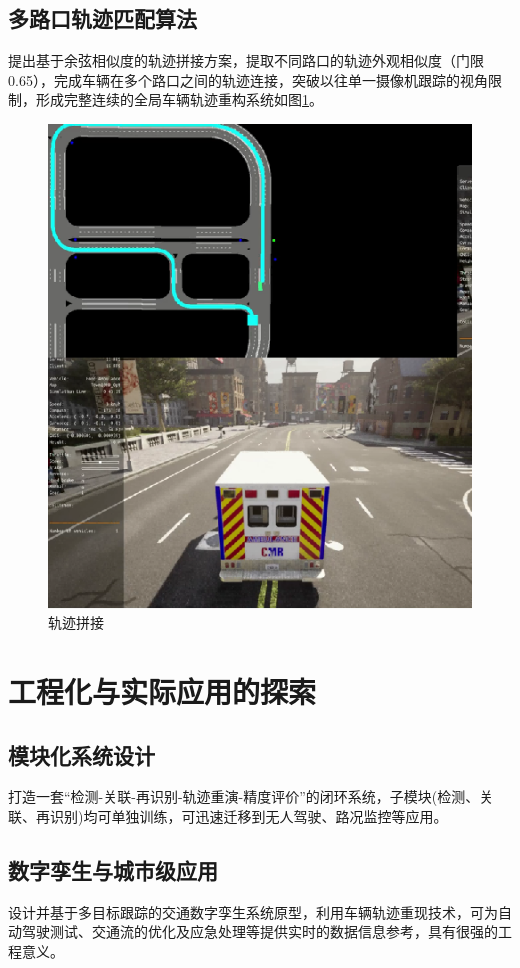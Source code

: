 \subsection{多路口轨迹匹配算法}

提出基于余弦相似度的轨迹拼接方案，提取不同路口的轨迹外观相似度（门限0.65），完成车辆在多个路口之间的轨迹连接，突破以往单一摄像机跟踪的视角限制，形成完整连续的全局车辆轨迹重构系统如图\ref{fig:p32}。


\begin{figure}[htbp] %
	\centering
	\includegraphics[width=1\textwidth]{p32} %
	\caption{轨迹拼接} %
	\label{fig:p32} %
\end{figure}




\section{工程化与实际应用的探索}

\subsection{模块化系统设计}

打造一套“检测-关联-再识别-轨迹重演-精度评价”的闭环系统，子模块(检测、关联、再识别)均可单独训练，可迅速迁移到无人驾驶、路况监控等应用。


\subsection{数字孪生与城市级应用}

设计并基于多目标跟踪的交通数字孪生系统原型，利用车辆轨迹重现技术，可为自动驾驶测试、交通流的优化及应急处理等提供实时的数据信息参考，具有很强的工程意义。


